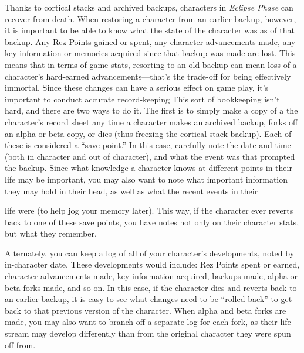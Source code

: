 Thanks to cortical stacks and archived backups, characters in \textit{Eclipse Phase} can recover from death. When restoring a character from an earlier backup, however, it is important to be able to know what the state of the character was as of that backup. Any Rez Points gained or spent, any character advancements made, any key information or memories acquired since that backup was made are lost. This means that in terms of game stats, resorting to an old backup can mean loss of a character's hard-earned advancements—that's the trade-off for being effectively immortal. Since these changes can have a serious effect on game play, it's important to conduct accurate record-keeping This sort of bookkeeping isn't hard, and there are two ways to do it. The first is to simply make a copy of a the character's record sheet any time a character makes an archived backup, forks off an alpha or beta copy, or dies (thus freezing the cortical stack backup). Each of these is considered a ``save point.'' In this case, carefully note the date and time (both in character and out of character), and what the event was that prompted the backup. Since what knowledge a character knows at different points in their life may be important, you may also want to note what important information they may hold in their head, as well as what the recent events in their 

life were (to help jog your memory later). This way, if the character ever reverts back to one of these save points, you have notes not only on their character stats, but what they remember. 

Alternately, you can keep a log of all of your character's developments, noted by in-character date. These developments would include: Rez Points spent or earned, character advancements made, key information acquired, backups made, alpha or beta forks made, and so on. In this case, if the character dies and reverts back to an earlier backup, it is easy to see what changes need to be ``rolled back'' to get back to that previous version of the character. When alpha and beta forks are made, you may also want to branch off a separate log for each fork, as their life stream may develop differently than from the original character they were spun off from. 

